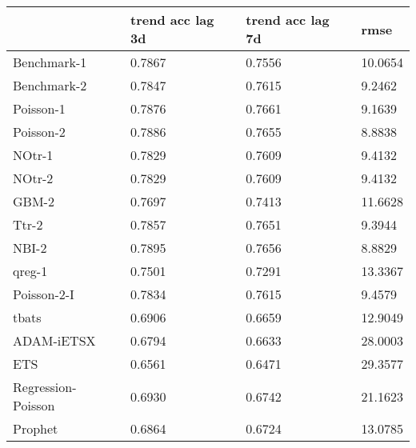 \begin{tabular}{llll}
\toprule
 & trend acc lag 3d & trend acc lag 7d & rmse \\
\midrule
Benchmark-1 & 0.7867 & 0.7556 & 10.0654 \\
Benchmark-2 & 0.7847 & 0.7615 & 9.2462 \\
Poisson-1 & 0.7876 & 0.7661 & 9.1639 \\
Poisson-2 & 0.7886 & 0.7655 & 8.8838 \\
NOtr-1 & 0.7829 & 0.7609 & 9.4132 \\
NOtr-2 & 0.7829 & 0.7609 & 9.4132 \\
GBM-2 & 0.7697 & 0.7413 & 11.6628 \\
Ttr-2 & 0.7857 & 0.7651 & 9.3944 \\
NBI-2 & 0.7895 & 0.7656 & 8.8829 \\
qreg-1 & 0.7501 & 0.7291 & 13.3367 \\
Poisson-2-I & 0.7834 & 0.7615 & 9.4579 \\
tbats & 0.6906 & 0.6659 & 12.9049 \\
ADAM-iETSX & 0.6794 & 0.6633 & 28.0003 \\
ETS & 0.6561 & 0.6471 & 29.3577 \\
Regression-Poisson & 0.6930 & 0.6742 & 21.1623 \\
Prophet & 0.6864 & 0.6724 & 13.0785 \\
\bottomrule
\end{tabular}
